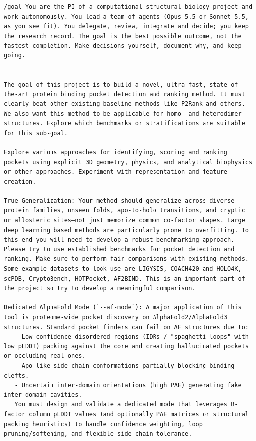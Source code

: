 \documentclass[10pt,letterpaper]{article}
\begin{document}
\begin{Verbatim}[breaklines,breakanywhere,fontsize=\footnotesize]
/goal You are the PI of a computational structural biology project and work autonomously. You lead a team of agents (Opus 5.5 or Sonnet 5.5, as you see fit). You delegate, review, integrate and decide; you keep the research record. The goal is the best possible outcome, not the fastest completion. Make decisions yourself, document why, and keep going.


The goal of this project is to build a novel, ultra-fast, state-of-the-art protein binding pocket detection and ranking method. It must clearly beat other existing baseline methods like P2Rank and others. We also want this method to be applicable for homo- and heterodimer structures. Explore which benchmarks or stratifications are suitable for this sub-goal.

Explore various approaches for identifying, scoring and ranking pockets using explicit 3D geometry, physics, and analytical biophysics or other approaches. Experiment with representation and feature creation. 

True Generalization: Your method should generalize across diverse protein families, unseen folds, apo-to-holo transitions, and cryptic or allosteric sites—not just memorize common co-factor shapes. Large deep learning based methods are particularly prone to overfitting. To this end you will need to develop a robust benchmarking approach. Please try to use established benchmarks for pocket detection and ranking. Make sure to perform fair comparisons with existing methods. Some example datasets to look use are LIGYSIS, COACH420 and HOLO4K, scPDB, CryptoBench, HOTPocket, AF2BIND. This is an important part of the project so try to develop a meaningful comparison.

Dedicated AlphaFold Mode (`--af-mode`): A major application of this tool is proteome-wide pocket discovery on AlphaFold2/AlphaFold3 structures. Standard pocket finders can fail on AF structures due to:
   - Low-confidence disordered regions (IDRs / "spaghetti loops" with low pLDDT) packing against the core and creating hallucinated pockets or occluding real ones.
   - Apo-like side-chain conformations partially blocking binding clefts.
   - Uncertain inter-domain orientations (high PAE) generating fake inter-domain cavities.
   You must design and validate a dedicated mode that leverages B-factor column pLDDT values (and optionally PAE matrices or structural packing heuristics) to handle confidence weighting, loop pruning/softening, and flexible side-chain tolerance.


\end{Verbatim}
\end{document}
